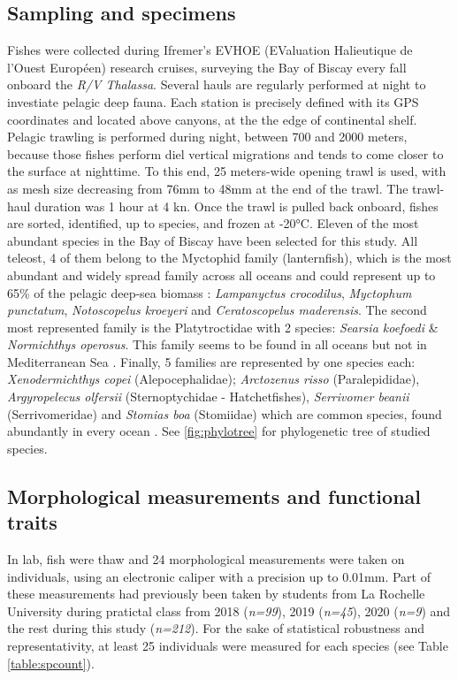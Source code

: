 

\subsection{Sampling and specimens}

Fishes were collected during Ifremer's EVHOE (EValuation Halieutique de l'Ouest Européen) research cruises, surveying the Bay of Biscay every fall onboard the \textit{R/V Thalassa}.
Several hauls are regularly performed at night to investiate pelagic deep fauna. Each station is precisely defined with its GPS coordinates and located above canyons, at the the edge of continental shelf. 
Pelagic trawling is performed during night, between 700 and 2000 meters, because those fishes perform diel vertical migrations and tends to come closer to the surface at nighttime. To this end, 25 meters-wide opening trawl is used, with as mesh size decreasing from 76mm to 48mm at the end of the trawl. The trawl-haul duration was 1 hour at 4 kn. 
Once the trawl is pulled back onboard, fishes are sorted, identified, up to species, and frozen at -20°C. Eleven of the most abundant species in the Bay of Biscay have been selected for this study. All teleost, 4 of them belong to the Myctophid family (lanternfish), which is the most abundant and widely spread family across all oceans \citep{debusserolles2014} and could represent up to 65\% of the pelagic deep-sea biomass \citep{poulsen2013}: \textit{Lampanyctus crocodilus}, \textit{Myctophum punctatum}, \textit{Notoscopelus kroeyeri} and \textit{Ceratoscopelus maderensis}. The second most represented family is the Platytroctidae with 2 species: \textit{Searsia koefoedi} \& \textit{Normichthys operosus}. This family seems to be found in all oceans but not in Mediterranean Sea \citep{orrell2016}. Finally, 5 families are represented by one species each: \textit{Xenodermichthys copei} (Alepocephalidae); \textit{Arctozenus risso} (Paralepididae), \textit{Argyropelecus olfersii} (Sternoptychidae - Hatchetfishes), \textit{Serrivomer beanii} (Serrivomeridae) and \textit{Stomias boa} (Stomiidae) which are common species, found abundantly in every ocean \citep{carvalho1988,froese2019,geidner2008,germain2019}. See \ref{fig:phylotree} for phylogenetic tree of studied species. 


\subsection{Morphological measurements and functional traits}
In lab, fish were thaw and 24 morphological measurements were taken on individuals, using an electronic caliper with a precision up to 0.01mm. Part of these measurements had previously been taken by students from La Rochelle University during pratictal class from 2018 (\textit{n=99}), 2019 (\textit{n=45}), 2020 (\textit{n=9}) and the rest during this study (\textit{n=212}). For the sake of statistical robustness and representativity, at least 25 individuals were measured for each species (see Table \ref{table:spcount}).  

